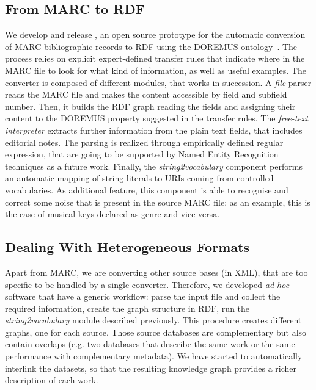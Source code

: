 \subsection{From MARC to RDF}
We develop and release , an open source prototype for the automatic conversion of MARC bibliographic records to RDF using the DOREMUS ontology~\cite{lisena2016exploring}. The process relies on explicit expert-defined transfer rules that indicate where in the MARC file to look for what kind of information, as well as useful examples. The converter is composed of different modules, that works in succession. A \textit{file} parser reads the MARC file and makes the content accessible by field and subfield number. Then, it builds the RDF graph reading the fields and assigning their content to the DOREMUS property suggested in the transfer rules. The \textit{free-text interpreter} extracts further information from the plain text fields, that includes editorial notes. The parsing is realized through empirically defined regular expression, that are going to be supported by Named Entity Recognition techniques as a future work. Finally, the \textit{string2vocabulary} component performs an automatic mapping of string literals to URIs coming from controlled vocabularies. As additional feature, this component is able to recognise and correct some noise that is present in the source MARC file: as an example, this is the case of musical keys declared as genre and vice-versa.

\subsection{Dealing With Heterogeneous Formats}
Apart from MARC, we are converting other source bases (in XML), that are too specific to be handled by a single converter. Therefore, we developed \textit{ad hoc} software that have a generic workflow: parse the input file and collect the required information, create the graph structure in RDF, run the \textit{string2vocabulary} module described previously. This procedure creates different graphs, one for each source. Those source databases are complementary but also contain overlaps (e.g. two databases that describe the same work or the same performance with complementary metadata). We have started to automatically interlink the datasets, so that the resulting knowledge graph provides a richer description of each work.

